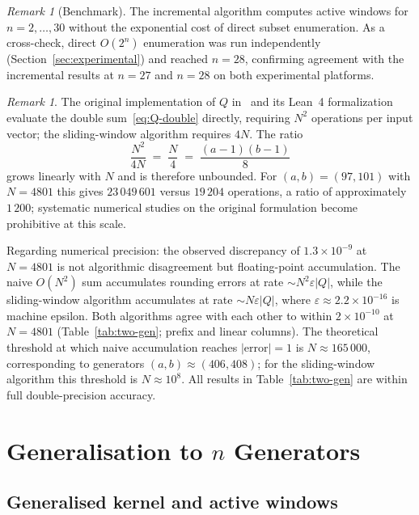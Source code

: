 \documentclass[11pt,a4paper]{amsart}
\theoremstyle{plain}
\theoremstyle{definition}
\theoremstyle{remark}
\newtheorem{remark}[theorem]{Remark}
\begin{document}
\begin{remark}[Benchmark]
The incremental algorithm computes active windows for $n = 2, \ldots, 30$
without the exponential cost of direct subset enumeration.
As a cross-check, direct $O(2^n)$ enumeration was run independently
(Section~\ref{sec:experimental}) and reached $n = 28$, confirming
agreement with the incremental results at $n = 27$ and $n = 28$
on both experimental platforms.
\end{remark}

\begin{remark}
The original implementation of $Q$ in~\cite{Huang2026} and its
Lean~4 formalization~\cite{AxiomProver2026} evaluate the double
sum~\eqref{eq:Q-double} directly, requiring $N^2$ operations per
input vector; the sliding-window algorithm requires $4N$. The ratio
\[
  \frac{N^2}{4N} \;=\; \frac{N}{4} \;=\; \frac{(a-1)(b-1)}{8}
\]
grows linearly with $N$ and is therefore unbounded.
For $(a,b)=(97,101)$ with $N=4801$ this gives $23\,049\,601$ versus
$19\,204$ operations, a ratio of approximately $1\,200$;
systematic numerical studies on the original formulation become
prohibitive at this scale.

Regarding numerical precision: the observed discrepancy of $1.3 \times 10^{-9}$
at $N = 4801$ is not algorithmic disagreement but floating-point accumulation.
The naive $O(N^2)$ sum accumulates rounding errors at rate $\sim N^2 \varepsilon \lvert Q \rvert$,
while the sliding-window algorithm accumulates at rate $\sim N \varepsilon \lvert Q \rvert$,
where $\varepsilon \approx 2.2 \times 10^{-16}$ is machine epsilon.
Both algorithms agree with each other to within $2 \times 10^{-10}$ at $N = 4801$
(Table~\ref{tab:two-gen}; prefix and linear columns).
The theoretical threshold at which naive accumulation reaches $\lvert \text{error} \rvert = 1$
is $N \approx 165\,000$, corresponding to generators $(a,b) \approx (406, 408)$;
for the sliding-window algorithm this threshold is $N \approx 10^8$.
All results in Table~\ref{tab:two-gen} are within full double-precision accuracy.
\end{remark}

\section{Generalisation to \texorpdfstring{$n$}{n} Generators}
\label{sec:generalisation}

\subsection{Generalised kernel and active windows}
\end{document}
